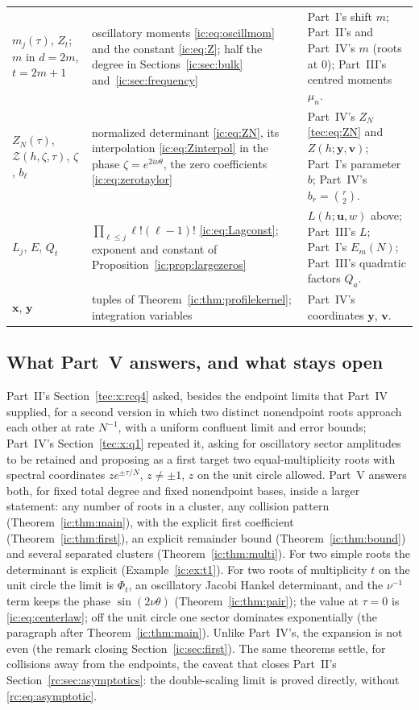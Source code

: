\documentclass[11pt,a4paper]{article}
\numberwithin{equation}{section}
\theoremstyle{definition}
\theoremstyle{remark}
\newcommand{\by}{\boldsymbol{y}}
\newcommand{\bv}{\boldsymbol v}
\newcommand{\bu}{\boldsymbol u}
\newcommand{\bx}{\boldsymbol x}
\begin{document}
\begin{longtable}{@{}>{\raggedright}p{}>{\raggedright}p{}>{\raggedright\arraybackslash}p{}@{}}
$m_j(\tau)$, $Z_t$; $m$ in $d=2m$, $t=2m+1$
 & oscillatory moments \eqref{ic:eq:oscillmom} and the constant
   \eqref{ic:eq:Z}; half the degree in Sections~\ref{ic:sec:bulk}
   and~\ref{ic:sec:frequency}
 & Part~I's shift $m$; Part~II's and Part~IV's $m$ (roots at $0$);
   Part~III's centred moments $\mu_n$.\\
$Z_N(\tau)$, $\mathcal Z(h,\zeta,\tau)$, $\zeta$, $b_\ell$
 & normalized determinant \eqref{ic:eq:ZN}, its interpolation
   \eqref{ic:eq:Zinterpol} in the phase $\zeta=e^{2i\nu\theta}$, the zero
   coefficients \eqref{ic:eq:zerotaylor}
 & Part~IV's $Z_N$ \eqref{tec:eq:ZN} and $Z(h;\by,\bv)$; Part~I's
   parameter $b$; Part~IV's $b_r=\binom r2$.\\
$L_j$, $E$, $Q_t$
 & $\prod_{\ell\le j}\ell!(\ell-1)!$ \eqref{ic:eq:Lagconst}; exponent and
   constant of Proposition~\ref{ic:prop:largezeros}
 & $L(h;\bu,w)$ above; Part~III's $L$; Part~I's $E_m(N)$; Part~III's
   quadratic factors $Q_a$.\\
$\bx$, $\by$
 & tuples of Theorem~\ref{ic:thm:profilekernel}; integration variables
 & Part~IV's coordinates $\by$, $\bv$.\\
\end{longtable}
\endgroup

\subsection{What Part~V answers, and what stays open}\label{ic:sec:answers}
Part~II's Section~\ref{tec:x:rcq4} asked, besides the endpoint limits that
Part~IV supplied, for a second version in which two distinct nonendpoint
roots approach each other at rate $N^{-1}$, with a uniform confluent limit
and error bounds; Part~IV's Section~\ref{tec:x:q1} repeated it, asking for
oscillatory sector amplitudes to be retained and proposing as a first target
two equal-multiplicity roots with spectral coordinates $ze^{\pm\tau/N}$,
$z\ne\pm1$, $z$ on the unit circle allowed.  Part~V answers both, for fixed
total degree and fixed nonendpoint bases, inside a larger statement: any
number of roots in a cluster, any collision pattern
(Theorem~\ref{ic:thm:main}), with the explicit first coefficient
(Theorem~\ref{ic:thm:first}), an explicit remainder bound
(Theorem~\ref{ic:thm:bound}) and several separated clusters
(Theorem~\ref{ic:thm:multi}).  For two simple roots the determinant is
explicit (Example~\ref{ic:ex:t1}).  For two roots of multiplicity $t$ on the
unit circle the limit is $\Phi_t$, an oscillatory Jacobi Hankel determinant,
and the $\nu^{-1}$ term keeps the phase $\sin(2\nu\theta)$
(Theorem~\ref{ic:thm:pair}); the value at $\tau=0$ is
\eqref{ic:eq:centerlaw}; off the unit circle one sector dominates
exponentially (the paragraph after Theorem~\ref{ic:thm:main}).  Unlike
Part~IV's, the expansion is not even (the remark closing
Section~\ref{ic:sec:first}).  The same theorems settle, for collisions away
from the endpoints, the caveat that closes Part~II's
Section~\ref{rc:sec:asymptotics}: the double-scaling limit is proved
directly, without \eqref{rc:eq:asymptotic}.
\end{document}

